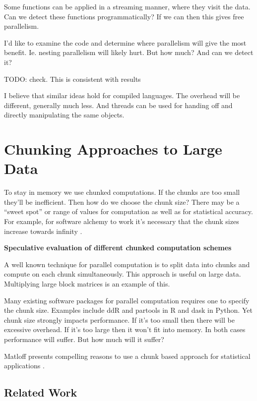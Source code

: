 \documentclass[12pt]{article}
\begin{document}
Some functions can be applied in a streaming manner, where they visit the
data. Can we detect these functions programmatically? If we can then this
gives free parallelism.

I'd like to examine the code and determine where parallelism will give the
most benefit. Ie. nesting parallelism will likely hurt. But how much? And
can we detect it?

TODO: check. This is consistent with results \cite{chambers2016extending}


I believe that similar ideas hold for compiled languages. The overhead will
be different, generally much less. And threads can be used for handing off
and directly manipulating the same objects.

\section{Chunking Approaches to Large Data}

To stay in memory we use chunked computations. If the chunks are too small
they'll be inefficient. Then how do we choose the chunk size?  There may be
a ``sweet spot'' or range of values for computation as well as for
statistical accuracy. For example, for software alchemy to work it's
necessary that the chunk sizes increase towards infinity
\cite{matloff2014software}.



\textbf{Speculative evaluation of different chunked computation schemes}

A well known technique for parallel computation is to split data into
chunks and compute on each chunk simultaneously. This approach 
is useful on large data. Multiplying large block matrices is an example of this.

Many existing software packages for parallel computation requires one to specify the
chunk size. Examples include ddR \cite{R-ddR} and partools
\cite{R-partools} in R and dask in Python.
Yet chunk size strongly impacts
performance. If it's too small then there will be excessive overhead. If
it's too large then it won't fit into memory. In both cases performance
will suffer. But how much will it suffer?

Matloff presents compelling reasons to use a chunk based
approach for statistical applications \cite{matloff2014software}.

\subsection{Related Work}
\end{document}
